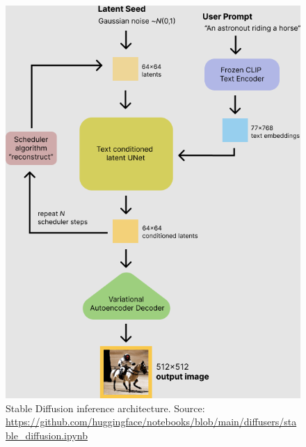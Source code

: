 \begin{figure}[ht]
    \centering
    \includegraphics[width=0.6\linewidth]{images/stable_diffusion.png}
    \caption{Stable Diffusion inference architecture. Source: \url{https://github.com/huggingface/notebooks/blob/main/diffusers/stable_diffusion.ipynb}}
    \label{fig:stable_diffusion}
\end{figure}